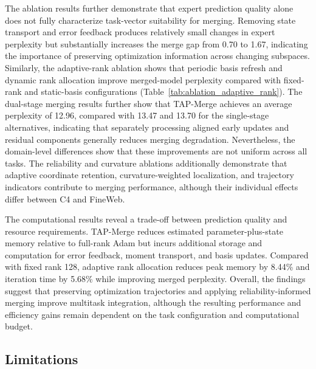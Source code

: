 \documentclass[fleqn,10pt]{wlscirep}
\begin{document}
The ablation results further demonstrate that expert prediction quality alone does not fully characterize task-vector suitability for merging. Removing state transport and error feedback produces relatively small changes in expert perplexity but substantially increases the merge gap from 0.70 to 1.67, indicating the importance of preserving optimization information across changing subspaces. Similarly, the adaptive-rank ablation shows that periodic basis refresh and dynamic rank allocation improve merged-model perplexity compared with fixed-rank and static-basis configurations (Table~\ref{tab:ablation_adaptive_rank}). The dual-stage merging results further show that TAP-Merge achieves an average perplexity of 12.96, compared with 13.47 and 13.70 for the single-stage alternatives, indicating that separately processing aligned early updates and residual components generally reduces merging degradation. Nevertheless, the domain-level differences show that these improvements are not uniform across all tasks. The reliability and curvature ablations additionally demonstrate that adaptive coordinate retention, curvature-weighted localization, and trajectory indicators contribute to merging performance, although their individual effects differ between C4 and FineWeb.

The computational results reveal a trade-off between prediction quality and resource requirements. TAP-Merge reduces estimated parameter-plus-state memory relative to full-rank Adam but incurs additional storage and computation for error feedback, moment transport, and basis updates. Compared with fixed rank 128, adaptive rank allocation reduces peak memory by 8.44\% and iteration time by 5.68\% while improving merged perplexity. Overall, the findings suggest that preserving optimization trajectories and applying reliability-informed merging improve multitask integration, although the resulting performance and efficiency gains remain dependent on the task configuration and computational budget.





\subsection{Limitations}
\label{subsec:limitations}
\end{document}
